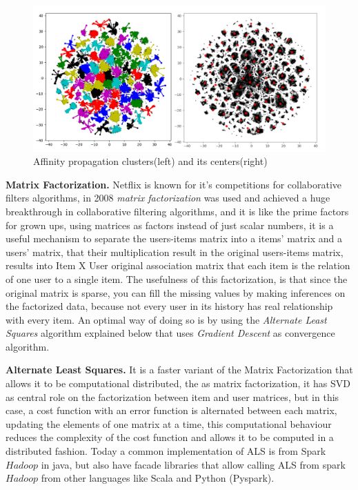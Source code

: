 \documentclass[ecp,tc,english]{iiufrgs}
\begin{document}
    \begin{figure}[H]
        \centering
        \includegraphics[width=1\textwidth]{images/affinity_twins.png}
        \caption{Affinity propagation clusters(left) and its centers(right)}
        \label{fig:affinity_twins}
    \end{figure}
    
    \textbf{Matrix Factorization.} Netflix is known for it's competitions for collaborative filters algorithms, in 2008 \textit{matrix factorization} \cite{10.5555/1087620} was used and achieved a huge breakthrough in collaborative filtering algorithms, and it is like the prime factors for grown ups, using matrices as factors instead of just scalar numbers, it is a useful mechanism to separate the users-items matrix into a items' matrix and a users' matrix, that their multiplication result in the original users-items matrix, results into Item X User original association matrix that each item is the relation of one user to a single item.
    The usefulness of this factorization, is that since the original matrix is sparse, you can fill the missing values by making inferences on the factorized data, because not every user in its history has real relationship with every item.
    An optimal way of doing so is by using the \textit{Alternate Least Squares} algorithm explained below that uses  \textit{Gradient Descent} as convergence algorithm.
    
    
    \textbf{Alternate Least Squares.} It is a faster variant of the Matrix Factorization that allows it to be computational distributed, the as matrix factorization, it has SVD as central role on the factorization between item and user matrices, but in this case, a cost function with an error function is alternated between each matrix, updating the elements of one matrix at a time, this computational behaviour reduces the complexity of the cost function and allows it to be computed in a distributed fashion.
    Today a common implementation of ALS is from Spark \(Hadoop\) in java, but also have facade libraries that allow calling ALS from spark \(Hadoop\) from other languages like Scala and Python (Pyspark).
\end{document}
